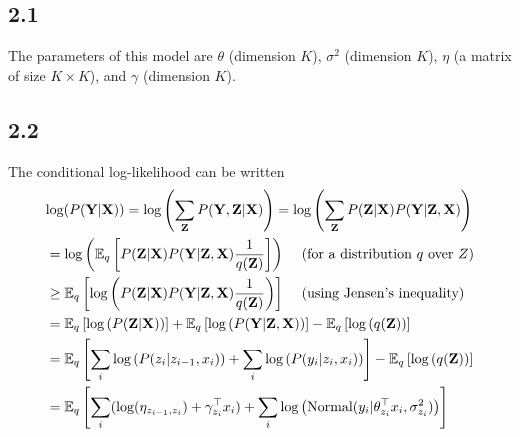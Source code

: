 \documentclass[12pt]{article}
\begin{document}
\subsection*{2.1}
The parameters of this model are $\theta$ (dimension $K$), $\sigma^2$ (dimension $K$), $\eta$ (a matrix of size $K \times K$), and $\gamma$ (dimension $K$).

\subsection*{2.2}

The conditional log-likelihood can be written
\begin{equation*}
    \begin{split}
        &\text{log}(P(\textbf{Y} | \textbf{X})) = \text{log} \left( \sum_{\textbf{Z}} P(\textbf{Y},\textbf{Z} | \textbf{X}) \right)
             = \text{log} \left( \sum_{\textbf{Z}} P(\textbf{Z} | \textbf{X}) P(\textbf{Y} | \textbf{Z}, \textbf{X}) \right)\\
        & =  \text{log} \left( \mathbb{E}_q \left[ P(\textbf{Z} | \textbf{X}) P(\textbf{Y} | \textbf{Z}, \textbf{X}) \frac{1}{q(\textbf{Z})} \right] \right)
             \text{ \hspace{3mm}(for a distribution $q$ over $Z$)}\\
        & \geq  \mathbb{E}_q \left[  \text{log} \left( P(\textbf{Z} | \textbf{X}) P(\textbf{Y} | \textbf{Z}, \textbf{X}) 
            \frac{1}{q(\textbf{Z})} \right) \right]
             \text{ \hspace{3mm}(using Jensen's inequality)}\\
        & = \mathbb{E}_q \left[ \text{log} \left( P(\textbf{Z} | \textbf{X}) \right) \right] 
             + \mathbb{E}_q \left[\text{log} \left( P(\textbf{Y} | \textbf{Z}, \textbf{X}) \right) \right] 
             - \mathbb{E}_q \left[\text{log} \left( q(\textbf{Z}) \right) \right] \\
        & = \mathbb{E}_q \left[ \sum_i \text{log} \left( P(z_i | z_{i-1}, x_i) \right)
             + \sum_i \text{log} \left( P(y_i | z_i, x_i) \right) \right] 
             - \mathbb{E}_q \left[\text{log} \left( q(\textbf{Z}) \right) \right] \\
        & = \mathbb{E}_q \left[ \sum_i (\text{log}(\eta_{z_{i-1},z_i}) + \gamma_{z_i}^{\top} x_i )
             + \sum_i \text{log} \left( \text{Normal}(y_i | \theta_{z_i}^{\top} x_i, \sigma_{z_i}^2) \right) \right] 

\end{split}
\end{equation*}
\end{document}
